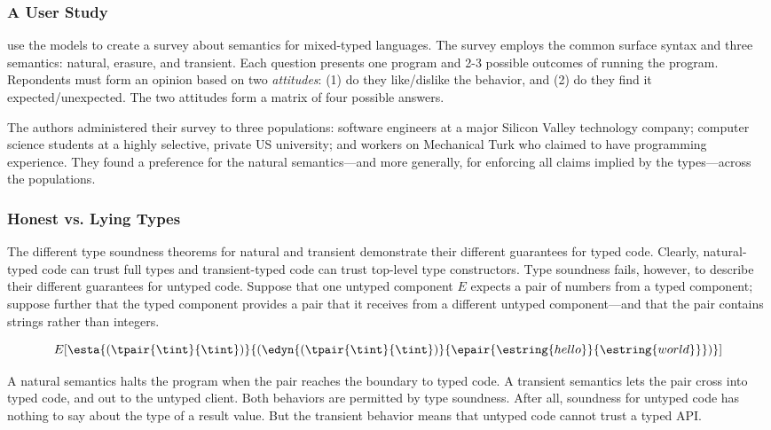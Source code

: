 \subsubsection{A User Study}

\citet{tgpk-dls-2018} use the models to create a survey about semantics
 for mixed-typed languages.
The survey employs the common surface syntax and three semantics:
 natural, erasure, and transient.
Each question presents one program and 2-3 possible outcomes of running
 the program.
Repondents must form an opinion based on two \emph{attitudes}:
 (1) do they like/dislike the behavior,
 and (2) do they find it expected/unexpected.
The two attitudes form a matrix of four possible answers.

The authors administered their survey to three populations:
 software engineers at a major Silicon Valley technology company;
 computer science students at a highly selective, private US university;
 and workers on Mechanical Turk who claimed to have programming experience.
They found a preference for the natural semantics---and more generally,
 for enforcing all claims implied by the types---across the populations.


\subsubsection{Honest vs. Lying Types}

The different type soundness theorems for natural and transient
 demonstrate their different guarantees for typed code.
Clearly, natural-typed code can trust full types and transient-typed code
 can trust top-level type constructors.
Type soundness fails, however, to describe their different guarantees for
 untyped code.
Suppose that one untyped component $E$ expects a pair of numbers from a
 typed component;
 suppose further that the typed component provides a pair that it receives
 from a different untyped component---and that the pair contains strings
 rather than integers.

\[
  E[\esta{(\tpair{\tint}{\tint})}{(\edyn{(\tpair{\tint}{\tint})}{\epair{\estring{hello}}{\estring{world}}})}]
\]

\noindent
A natural semantics halts the program when the pair reaches the boundary to
 typed code.
A transient semantics lets the pair cross into typed code, and out to the
 untyped client.
Both behaviors are permitted by type soundness.
After all, soundness for untyped code has nothing to say about the type of a
 result value.
But the transient behavior means that untyped code cannot trust a typed
 API.

